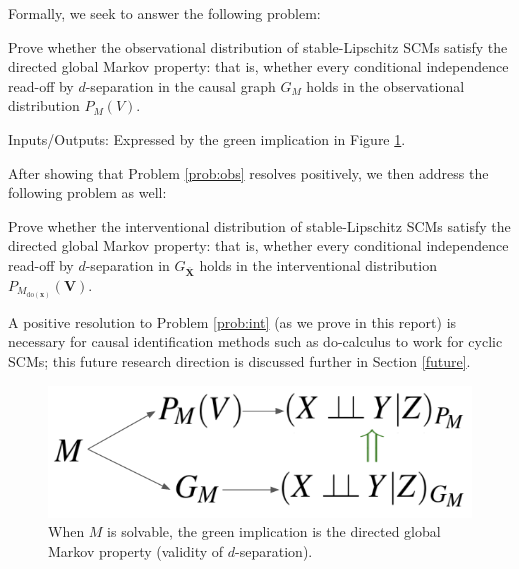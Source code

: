 \documentclass[12pt]{article}
\begin{document}

Formally, we seek to answer the following problem:

\begin{problem}
\label{prob:obs}

Prove whether the observational distribution of stable-Lipschitz SCMs satisfy the directed global Markov property: that is, whether every conditional independence read-off by $d$-separation in the causal graph $G_M$ holds in the observational distribution $P_M(V)$.

Inputs/Outputs: Expressed by the green implication in Figure \ref{fig:dsep-Markov-flow}.
\end{problem}

After showing that Problem \ref{prob:obs} resolves positively, we then address the following problem as well:

\begin{problem}
\label{prob:int}

Prove whether the interventional distribution of stable-Lipschitz SCMs satisfy the directed global Markov property: that is, whether every conditional independence read-off by $d$-separation in $G_{\overline{\mathbf{X}}}$ holds in the interventional distribution $P_{M_{\text{do}(\mathbf{x})}}(\mathbf{V})$.
\end{problem}

A positive resolution to Problem \ref{prob:int} (as we prove in this report) is necessary for causal identification methods such as do-calculus to work for cyclic SCMs; this future research direction is discussed further in Section \ref{future}.



\begin{figure}
\centering
\includegraphics[width=.35\linewidth]{pics/my_own/dsep_Markov_flow.png}
\caption{When $M$ is solvable, the green implication is the directed global Markov property (validity of $d$-separation).}
\label{fig:dsep-Markov-flow}
\end{figure}
\end{document}
